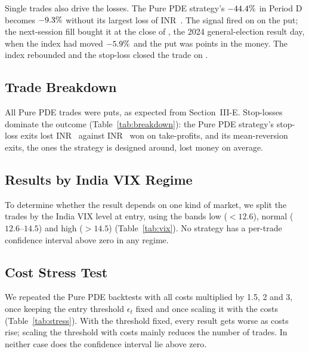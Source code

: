 \documentclass[10pt,journal,compsoc]{IEEEtran}
\begin{document}
Single trades also drive the losses. The Pure PDE strategy's $-44.4\%$ in Period D becomes $-9.3\%$ without its largest loss of INR~\PureDLargest. The signal fired on \LargestSignalDate{} on the \LargestStrike{} put; the next-session fill bought it at the close of \LargestEntryDate, the 2024 general-election result day, when the index had moved $-5.9\%$ and the put was \LargestITM{} points in the money. The index rebounded and the stop-loss closed the trade on \LargestExitDate.

\subsection{Trade Breakdown}

All \PurePutsTotal{} Pure PDE trades were puts, as expected from Section~III-E. Stop-losses dominate the outcome (Table~\ref{tab:breakdown}): the Pure PDE strategy's stop-loss exits lost INR~\PureStopLossPnL{} against INR~\PureTakeProfitPnL{} won on take-profits, and its mean-reversion exits, the ones the strategy is designed around, lost money on average.

\subsection{Results by India VIX Regime}
To determine whether the result depends on one kind of market, we split the trades by the India VIX level at entry, using the bands low ($<12.6$), normal ($12.6$--$14.5$) and high ($>14.5$) (Table~\ref{tab:vix}). No strategy has a per-trade confidence interval above zero in any regime.



\subsection{Cost Stress Test}
We repeated the Pure PDE backtests with all costs multiplied by 1.5, 2 and 3, once keeping the entry threshold $\epsilon_t$ fixed and once scaling it with the costs (Table~\ref{tab:stress}). With the threshold fixed, every result gets worse as costs rise; scaling the threshold with costs mainly reduces the number of trades. In neither case does the confidence interval lie above zero.


\end{document}
